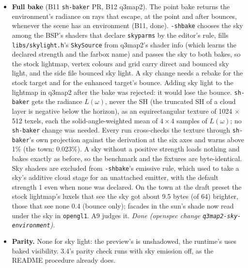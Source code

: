 \documentclass[11pt,a4paper]{article}
\begin{document}
\begin{itemize}
  cosine-weighted fraction of the point's first rays that escape, $\sum e_i\cos\theta_i /
  \sum\cos\theta_i$, which makes the sky's irradiance at the normal times visibility exact for a
  uniform sky; and per grid probe from side file v3 (B13, q3map2 only; done, \texttt{q3map2-sh-grid-visibility}), the uniform fraction over
  the sphere, since a probe has no normal (B11, \texttt{sh-baker} \#70). Sky surfaces stay non-casting, so rays
  pass through the town's low sky ceiling. \texttt{renderer\_sh} projects the sky shader to SH at
  load (C6) and adds its irradiance at the normal times that visibility, replacing sh-renderer's
  flat term. The direct term follows a sky change, even per frame; the bounce changes only with a
  rebake, and the direct term's occlusion is non-directional; accepted. (Until B11 merged the
  indirect bake was to carry no sky radiance at all, making enhanced sky light unbounced.)
\item \textbf{Full bake} (B11 \texttt{sh-baker} PR, B12 q3map2). The point bake returns the
  environment's radiance on rays that escape, at the point and after bounces, whenever the scene
  has an environment (B11, done). \texttt{-shbake} chooses the sky among the BSP's shaders that
  declare \texttt{skyparms} by the editor's rule, fills \texttt{libs/skylight.h}'s
  \texttt{SkySource} from q3map2's shader info (which learns the declared strength and the farbox
  name) and passes the sky to both bakes, so the stock lightmap, vertex colours and grid carry
  direct and bounced sky light, and the side file bounced sky light. A sky change needs a rebake for
  the stock target and for the enhanced target's bounce. Adding sky light to the lightmap in q3map2
  after the bake was rejected: it would lose the bounce. \texttt{sh-baker} gets the radiance
  $L(\omega)$, never the SH (the truncated SH of a cloud layer is negative below the horizon), as an
  equirectangular texture of 1024 $\times$ 512 texels, each the solid-angle-weighted mean of
  $4\times4$ samples of $L(\omega)$; no \texttt{sh-baker} change was needed. Every run cross-checks
  the texture through \texttt{sh-baker}'s own projection against the derivation at the six axes and
  warns above 1\% (the town: 0.023\%). A sky without a positive strength loads nothing and bakes
  exactly as before, so the benchmark and the fixtures are byte-identical. Sky shaders are excluded
  from \texttt{-shbake}'s emissive rule, which used to take a sky's additive cloud stage for an
  unattached emitter, with the default strength 1 even when none was declared. On the town at the
  draft preset the stock lightmap's luxels that see the sky got about 9.5 bytes (of 64) brighter,
  those that see none 0.4 (bounce only); facades in the sun's shade now read under the sky in
  \texttt{opengl1}. A9 judges it. \emph{Done (openspec change \texttt{q3map2-sky-environment}).}
\item \textbf{Parity.} None for sky light: the preview's is unshadowed, the runtime's uses baked
  visibility. 3.4's parity check runs with sky emission off, as the README procedure already does.
\end{itemize}
\end{document}
